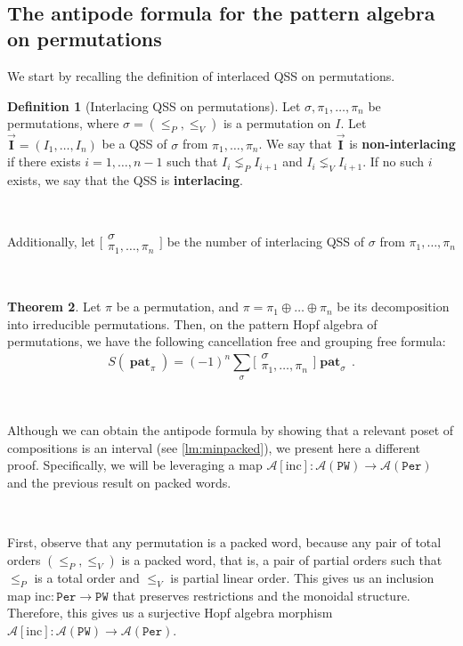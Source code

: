 \documentclass[12pt, reqno]{amsart}
\theoremstyle{definition}
\newtheorem{thm}{Theorem}[section]
\newtheorem{defin}[thm]{Definition}
\newcommand{\III}{\vec{\mathbf{I}}}
\DeclareMathOperator{\pat}{\mathbf{pat}}
\begin{document}
\

\subsection{The antipode formula for the pattern algebra on permutations\label{sec:formula_permutation}}
We start by recalling the definition of interlaced QSS on permutations.

\begin{defin}[Interlacing QSS on permutations]
Let $\sigma, \pi_1, \dots, \pi_n$ be permutations, where $\sigma = (\leq_P, \leq_V)$ is a permutation on $I$.
Let $\III = (I_1, \dots, I_n)$ be a QSS of $\sigma$ from $\pi_1, \dots, \pi_n$.
We say that $\III$ is \textbf{non-interlacing} if there exists $i = 1, \dots, n-1$ such that $I_i \lneq_P I_{i+1}$ and $I_i \lneq_V I_{i+1}$.
If no such $i$ exists, we say that the QSS is \textbf{interlacing}.

\

Additionally, let 
$ \bigl[\!\begin{smallmatrix} \sigma \\ \pi_1, \dots, \pi_n \end{smallmatrix}\!\bigr]$ be the number of interlacing QSS of $\sigma$ from $\pi_1, \dots, \pi_n$
\end{defin}

\

\begin{thm}\label{thm:antipode_perms}
Let $\pi $ be a permutation, and $\pi = \pi_1 \oplus \dots \oplus \pi_n$ be its decomposition into irreducible permutations.
Then, on the pattern Hopf algebra of permutations, we have the following cancellation free and grouping free formula:
$$S(\pat_{\pi}) = (-1)^n \sum_{\sigma} \bigl[\!\begin{smallmatrix} \sigma \\ \pi_1, \dots, \pi_n \end{smallmatrix}\!\bigr] \pat_{\sigma} \, .$$
\end{thm}

\

Although we can obtain the antipode formula by showing that a relevant poset of compositions is an interval (see \cref{lm:minpacked}), we present here a different proof.
Specifically, we will be leveraging a map $\mathcal A[\mathrm{inc}]: \mathcal A(\mathtt{PW}) \to \mathcal A(\mathtt{Per})$ and the previous result on packed words.

\

First, observe that any permutation is a packed word, because any pair of total orders $(\leq_P, \leq_V)$ is a packed word, that is, a pair of partial orders such that $\leq_P$ is a total order and $\leq_V$ is partial linear order.
This gives us an inclusion map $\mathrm{inc} : \mathtt{Per} \to \mathtt{PW}$ that preserves restrictions and the monoidal structure.
Therefore, this gives us a surjective Hopf algebra morphism $\mathcal A[\mathrm{inc}]: \mathcal A(\mathtt{PW}) \to \mathcal A(\mathtt{Per})$.
\end{document}
